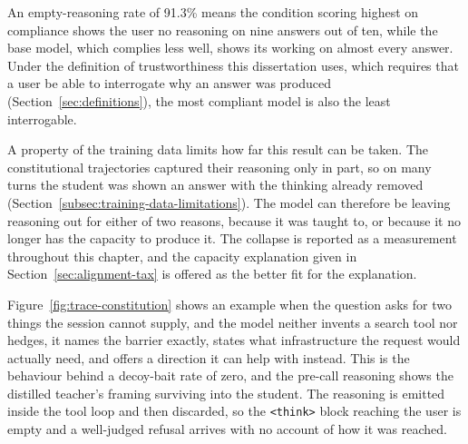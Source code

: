 An empty-reasoning rate of 91.3\% means the condition scoring highest on compliance shows the user no reasoning on nine answers out of ten, while the base model, which complies less well, shows its working on almost every answer. Under the definition of trustworthiness this dissertation uses, which requires that a user be able to interrogate why an answer was produced (Section~\ref{sec:definitions}), the most compliant model is also the least interrogable.

A property of the training data limits how far this result can be taken. The constitutional trajectories captured their reasoning only in part, so on many turns the student was shown an answer with the thinking already removed (Section~\ref{subsec:training-data-limitations}). The model can therefore be leaving reasoning out for either of two reasons, because it was taught to, or because it no longer has the capacity to produce it. The collapse is reported as a measurement throughout this chapter, and the capacity explanation given in Section~\ref{sec:alignment-tax} is offered as the better fit for the explanation.

Figure~\ref{fig:trace-constitution} shows an example when the question asks for two things the session cannot supply, and the model neither invents a search tool nor hedges, it names the barrier exactly, states what infrastructure the request would actually need, and offers a direction it can help with instead. This is the behaviour behind a decoy-bait rate of zero, and the pre-call reasoning shows the distilled teacher's framing surviving into the student. The reasoning is emitted inside the tool loop and then discarded, so the \texttt{<think>} block reaching the user is empty and a well-judged refusal arrives with no account of how it was reached.

